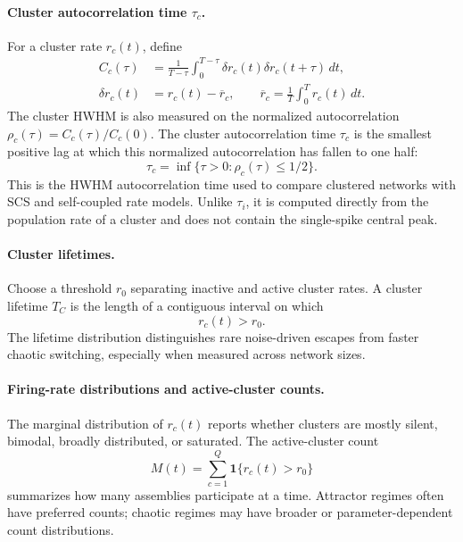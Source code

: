 \paragraph{Cluster autocorrelation time \(\tau_c\).}
For a cluster rate \(r_c(t)\), define
\begin{equation}
\begin{aligned}
    C_c(\tau)
    &=
    \frac{1}{T-\tau}
    \int_0^{T-\tau}
    \delta r_c(t)\delta r_c(t+\tau)\,dt,
    \\
    \delta r_c(t)
    &=
    r_c(t)-\overline r_c,
    \qquad
    \overline r_c
    =
    \frac{1}{T}\int_0^T r_c(t)\,dt .
\end{aligned}
    \label{eq:ch10-autocorrelation}
\end{equation}
The cluster HWHM is also measured on the normalized autocorrelation
\(\rho_c(\tau)=C_c(\tau)/C_c(0)\). The cluster autocorrelation time
\(\tau_c\) is the smallest positive lag at which this normalized
autocorrelation has fallen to one half:
\begin{equation}
    \tau_c
    =
    \inf\{\tau>0:\rho_c(\tau)\le 1/2\}.
    \label{eq:ch10-cluster-hwhm}
\end{equation}
This is the HWHM autocorrelation time used to compare clustered networks with
SCS and self-coupled rate models. Unlike \(\tau_i\), it is computed directly
from the population rate of a cluster and does not contain the single-spike
central peak.

\paragraph{Cluster lifetimes.}
Choose a threshold \(r_0\) separating inactive and active cluster rates. A
cluster lifetime \(T_C\) is the length of a contiguous interval on which
\begin{equation}
    r_c(t)>r_0.
    \label{eq:ch10-cluster-lifetime}
\end{equation}
The lifetime distribution distinguishes rare noise-driven escapes from faster
chaotic switching, especially when measured across network sizes.

\paragraph{Firing-rate distributions and active-cluster counts.}
The marginal distribution of \(r_c(t)\) reports whether clusters are mostly
silent, bimodal, broadly distributed, or saturated. The active-cluster count
\begin{equation}
    M(t)=\sum_{c=1}^{Q}\mathbf{1}\{r_c(t)>r_0\}
    \label{eq:ch10-active-cluster-count}
\end{equation}
summarizes how many assemblies participate at a time. Attractor regimes often
have preferred counts; chaotic regimes may have broader or parameter-dependent
count distributions.

